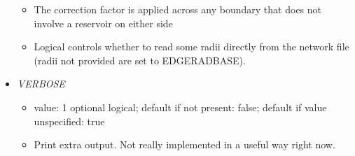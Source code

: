 \documentclass[12pt]{article}
\begin{document}
\begin{itemize}
\begin{itemize}
	\item The correction factor is applied across any boundary that does not involve a reservoir on either side
	\item Logical controls whether to read some radii directly from the network file (radii not provided are set to EDGERADBASE). 
\end{itemize}
%
\item {\it VERBOSE}
        \begin{itemize}
          \item  value: 1 optional logical; default if not present: false; default if value unspecified: true
          \item Print extra output. Not really implemented in a useful way right now.
        \end{itemize}

\end{itemize}

%
%
\end{document}
